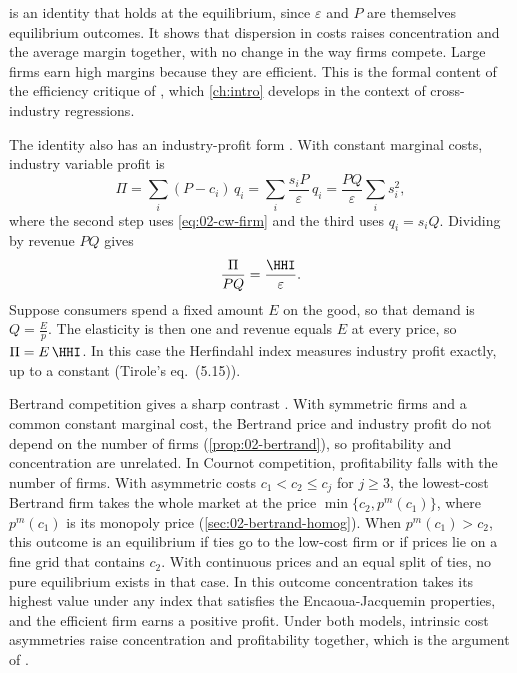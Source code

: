  is an identity that holds at the equilibrium, since $\varepsilon$ and $P$ are themselves
equilibrium outcomes. It shows that dispersion in costs raises concentration and the average margin together, with
no change in the way firms compete. Large firms earn high margins because they are efficient. This is the formal
content of the efficiency critique of \citet{Demsetz1973}, which \cref{ch:intro} develops in the context of
cross-industry regressions.

The identity also has an industry-profit form \citep[eq.~(5.14) and Exercise~5.6]{Tirole1988}. With constant
marginal costs, industry variable profit is
\[
  \Pi = \sum_i (P - c_i)\,q_i = \sum_i \frac{s_iP}{\varepsilon}\,q_i = \frac{PQ}{\varepsilon}\sum_i s_i^2 ,
\]
where the second step uses \eqref{eq:02-cw-firm} and the third uses $q_i = s_iQ$. Dividing by revenue $PQ$ gives
\begin{equation}\label{eq:02-cw-profit}
  \frac{\Pi}{PQ} = \frac{\HHI}{\varepsilon} .
\end{equation}
Suppose consumers spend a fixed amount $E$ on the good, so that demand is $Q = \frac{E}{p}$. The elasticity is then
one and revenue equals $E$ at every price, so $\Pi = E\,\HHI$. In this case the Herfindahl index measures industry
profit exactly, up to a constant (Tirole's eq.~(5.15)).

Bertrand competition gives a sharp contrast \citep[sec.~5.5]{Tirole1988}. With symmetric firms and a common
constant marginal cost, the Bertrand price and industry profit do not depend on the number of firms
(\cref{prop:02-bertrand}), so profitability and concentration are unrelated. In Cournot competition, profitability
falls with the number of firms. With asymmetric costs $c_1 < c_2 \le c_j$ for $j \ge 3$, the lowest-cost Bertrand
firm takes the whole market at the price $\min\{c_2, p^m(c_1)\}$, where $p^m(c_1)$ is its monopoly price
(\cref{sec:02-bertrand-homog}). When $p^m(c_1) > c_2$, this outcome is an equilibrium if ties go to the low-cost
firm or if prices lie on a fine grid that contains $c_2$. With continuous prices and an equal split of ties, no pure
equilibrium exists in that case. In this outcome concentration takes its highest value under any index that satisfies the
Encaoua-Jacquemin properties, and the efficient firm earns a positive profit. Under both models, intrinsic cost
asymmetries raise concentration and profitability together, which is the argument of \citet{Demsetz1973}.

